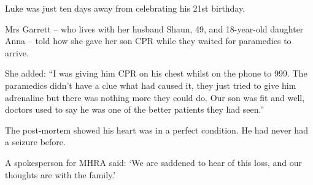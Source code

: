 {Luke was just ten days away from celebrating his 21st birthday.

Mrs Garrett – who lives with her husband Shaun, 49, and 18-year-old daughter
Anna – told how she gave her son CPR while they waited for paramedics to arrive.

She added: “I was giving him CPR on his chest whilst on the phone to 999. The
paramedics didn’t have a clue what had caused it, they just tried to give him
adrenaline but there was nothing more they could do. Our son was fit and well,
doctors used to say he was one of the better patients they had seen.”

The post-mortem showed his heart was in a perfect condition. He had never had a
seizure before.

A spokesperson for MHRA said: ‘We are saddened to hear of this loss, and our
thoughts are with the family.’

}
